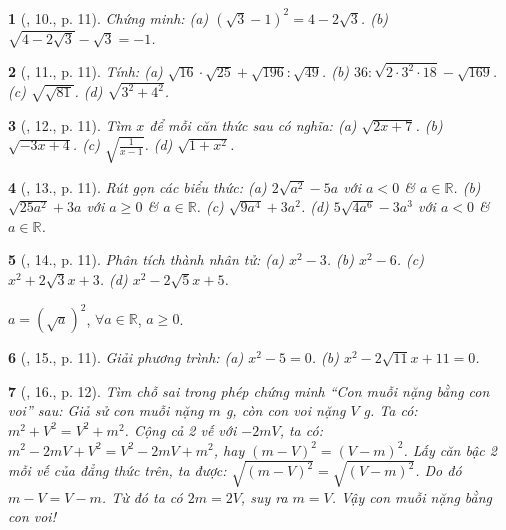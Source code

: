 \documentclass{article}
\newtheorem{baitoan}{}
\begin{document}
\begin{baitoan}[\cite{SGK_Toan_9_tap_1}, 10., p. 11]
	Chứng minh: (a) $(\sqrt{3} - 1)^2 = 4 - 2\sqrt{3}$. (b) $\sqrt{4 - 2\sqrt{3}} - \sqrt{3} = -1$.
\end{baitoan}

\begin{baitoan}[\cite{SGK_Toan_9_tap_1}, 11., p. 11]
	Tính: (a) $\sqrt{16}\cdot\sqrt{25} + \sqrt{196}:\sqrt{49}$. (b) $36:\sqrt{2\cdot3^2\cdot18} - \sqrt{169}$. (c)  $\sqrt{\sqrt{81}}$. (d) $\sqrt{3^2 + 4^2}$.
\end{baitoan}

\begin{baitoan}[\cite{SGK_Toan_9_tap_1}, 12., p. 11]
	Tìm $x$ để mỗi căn thức sau có nghĩa: (a) $\sqrt{2x + 7}$. (b) $\sqrt{-3x + 4}$. (c) $\sqrt{\frac{1}{x - 1}}$. (d) $\sqrt{1 + x^2}$.
\end{baitoan}

\begin{baitoan}[\cite{SGK_Toan_9_tap_1}, 13., p. 11]
	Rút gọn các biểu thức: (a) $2\sqrt{a^2} - 5a$ với $a < 0$ \& $a\in\mathbb{R}$. (b) $\sqrt{25a^2} + 3a$ với $a\ge0$ \& $a\in\mathbb{R}$. (c) $\sqrt{9a^4} + 3a^2$. (d) $5\sqrt{4a^6} - 3a^3$ với $a < 0$ \& $a\in\mathbb{R}$.
\end{baitoan}

\begin{baitoan}[\cite{SGK_Toan_9_tap_1}, 14., p. 11]
	Phân tích thành nhân tử: (a) $x^2 - 3$. (b) $x^2 - 6$. (c) $x^2 + 2\sqrt{3}x + 3$. (d) $x^2 - 2\sqrt{5}x + 5$.
\end{baitoan}
 $a = (\sqrt{a})^2$, $\forall a\in\mathbb{R}$, $a\ge0$.

\begin{baitoan}[\cite{SGK_Toan_9_tap_1}, 15., p. 11]
	Giải phương trình: (a) $x^2 - 5 = 0$. (b) $x^2 - 2\sqrt{11}x + 11 = 0$.
\end{baitoan}

\begin{baitoan}[\cite{SGK_Toan_9_tap_1}, 16., p. 12]
	Tìm chỗ sai trong phép chứng minh ``Con muỗi nặng bằng con voi'' sau: Giả sử con muỗi nặng $m$ \emph{g}, còn con voi nặng $V$ \emph{g}. Ta có: $m^2 + V^2 = V^2 + m^2$. Cộng cả 2 vế với $-2mV$, ta có: $m^2 - 2mV + V^2 = V^2 - 2mV + m^2$, hay $(m - V)^2 = (V - m)^2$. Lấy căn bậc 2 mỗi vế của đẳng thức trên, ta được: $\sqrt{(m - V)^2} = \sqrt{(V - m)^2}$. Do đó $m - V = V - m$. Từ đó ta có $2m = 2V$, suy ra $m = V$. Vậy con muỗi nặng bằng con voi!
\end{baitoan}
\end{document}
